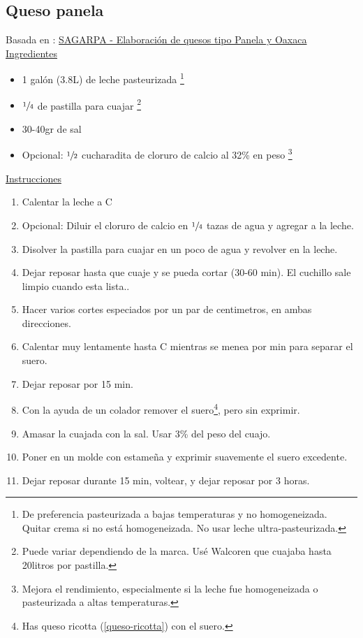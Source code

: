 \subsection{Queso panela}

Basada en : \href{http://www.sagarpa.gob.mx/desarrolloRural/Documents/fichasaapt/Elaboraci%C3%B3n%20de%20quesos.pdf}{SAGARPA - Elaboración de quesos tipo Panela y Oaxaca} \\

\underline{Ingredientes}
\begin{itemize}
\item 1 gal\'on (3.8L) de leche pasteurizada \footnote{De preferencia pasteurizada a bajas temperaturas y no homogeneizada. Quitar crema si no está homogeneizada. No usar leche ultra-pasteurizada.}
\item $\sfrac{1}{4}$ de pastilla para cuajar \footnote{Puede variar dependiendo de la marca. Usé Walcoren que cuajaba hasta 
\Sim 20litros por pastilla.}
\item 30-40gr de sal
\item Opcional: $\sfrac{1}{2}$ cucharadita de cloruro de calcio al 32\% en peso \footnote{Mejora el rendimiento, especialmente si la leche fue homogeneizada o pasteurizada a altas temperaturas.}
\end{itemize}


\underline{Instrucciones}
\begin{enumerate}
\item Calentar la leche a  \deg C
\item Opcional: Diluir el cloruro de calcio en $\sfrac{1}{4}$ tazas de agua y agregar a la leche.
\item Disolver la pastilla para cuajar en un poco de agua y revolver en la leche.
\item Dejar reposar hasta que cuaje y se pueda cortar (30-60 min). El cuchillo sale limpio cuando esta lista..
\item Hacer varios cortes especiados por un par de centimetros, en ambas direcciones.
\item Calentar muy lentamente hasta  \deg C mientras se menea por  min para separar el suero.
\item Dejar reposar por 15 min.
\item Con la ayuda de un colador remover el suero\footnote{Has queso ricotta (\ref{queso-ricotta}) con el suero.}, pero sin exprimir.
\item Amasar la cuajada con la sal. Usar 3\% del peso del cuajo.
\item Poner en un molde con estame\~na y exprimir suavemente el suero excedente.
\item Dejar reposar durante 15 min, voltear, y dejar reposar por 3 horas.
\end{enumerate}
